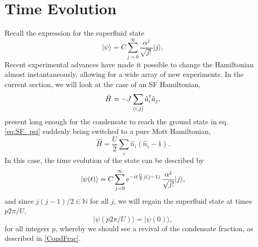 \chapter{Time Evolution}
Recall the expression for the superfluid state
\begin{equation}\label{eq:SF_psi}
\lvert \psi \rangle = C \sum_{j=0}^{\infty} \frac{\alpha^j}{\sqrt{j!}}\lvert j\rangle,
\end{equation}
Recent experimental advances have made it possible to change the Hamiltonian almost instantaneously, allowing for a wide array of new experiments. In the current section, we will look at the case of an SF Hamiltonian,
\begin{equation}\label{eq:SF_ham}
\hat{H} = -J \sum_{\braket{i,j}} \hat{a}_{i}^{\dag} \hat{a}_j,
\end{equation}
 present long enough for the condensate to reach the ground state in eq. \ref{eq:SF_psi} suddenly being switched to a pure Mott Hamiltonian,
\begin{equation}
 \hat{H} = \frac{U}{2} \sum_{i} \hat{n}_i \left( \hat{n}_i -1 \right).
\end{equation}
%
In this case, the time evolution of the state can be described by
\begin{equation}
\lvert \psi (t) \rangle = C \sum_{j=0}^{\infty} \operatorname{e}^{-it \frac{U}{2} j(j-1)}\frac{\alpha^j}{\sqrt{j!}}\lvert j\rangle,
\end{equation}
and since $j(j-1)/2\in \mathbb{N}$ for all $j$, we will regain the superfluid state at times $p2\pi/U$,
\begin{equation}
\lvert \psi (p2\pi/U) \rangle = \lvert \psi (0) \rangle,
\end{equation}
for all integers $p$, whereby we should see a revival of the condensate fraction, as described in \ref{CondFrac}.

